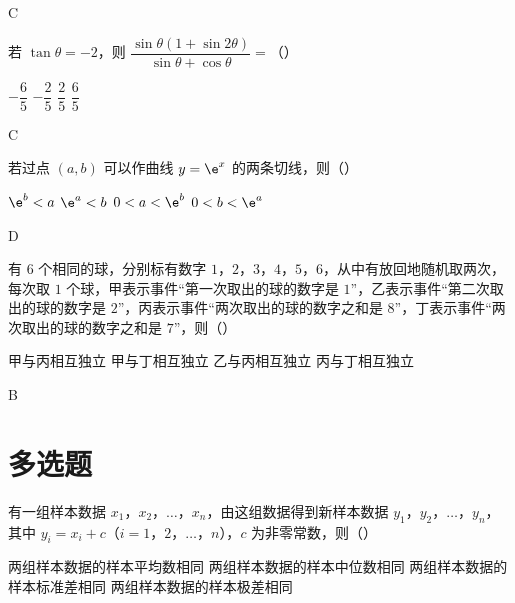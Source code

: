 \begin{answer}
C
\end{answer}

\begin{problem}
若 \(\tan\theta=-2\)，则 \(\dfrac{\sin\theta\left( 1+\sin2\theta \right)}{\sin\theta+\cos\theta}=\)（\quad）

\choices
    {\(-\dfrac{6}{5}\)}
    {\(-\dfrac{2}{5}\)}
    {\(\dfrac{2}{5}\)}
    {\(\dfrac{6}{5}\)}
\end{problem}

\begin{answer}
C
\end{answer}

\begin{problem}
若过点 \((a,b)\) 可以作曲线 \(y=\e^x\) 的两条切线，则（\quad）

\choices
    {\(\e^b<a\)}
    {\(\e^a<b\)}
    {\(0<a<\e^b\)}
    {\(0<b<\e^a\)}
\end{problem}

\begin{answer}
D
\end{answer}

\begin{problem}
有 \(6\) 个相同的球，分别标有数字 \(1\)，\(2\)，\(3\)，\(4\)，\(5\)，\(6\)，从中有放回地随机取两次，每次取 \(1\) 个球，甲表示事件“第一次取出的球的数字是 \(1\)”，乙表示事件“第二次取出的球的数字是 \(2\)”，丙表示事件“两次取出的球的数字之和是 \(8\)”，丁表示事件“两次取出的球的数字之和是 \(7\)”，则（\quad）

\choices
    {甲与丙相互独立}
    {甲与丁相互独立}
    {乙与丙相互独立}
    {丙与丁相互独立}
\end{problem}

\begin{answer}
B
\end{answer}

\section{多选题}

\begin{problem}
有一组样本数据 \(x_1\)，\(x_2\)，\(\dots\)，\(x_n\)，由这组数据得到新样本数据 \(y_1\)，\(y_2\)，\(\dots\)，\(y_n\)，其中 \(y_i=x_i+c\)（\(i=1\)，\(2\)，\(\dots\)，\(n\)），\(c\) 为非零常数，则（\quad）

\choices
    {两组样本数据的样本平均数相同}
    {两组样本数据的样本中位数相同}
    {两组样本数据的样本标准差相同}
    {两组样本数据的样本极差相同}
\end{problem}

